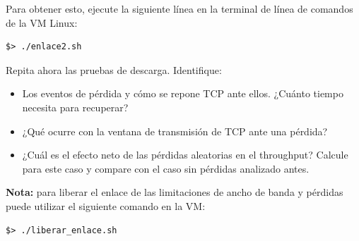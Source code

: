 \documentclass[a4paper,10pt]{article}
\begin{document}
\begin{enumerate}
Para obtener esto, ejecute la siguiente línea en la terminal de línea de comandos de la VM Linux:
   \begin{verbatim}
$> ./enlace2.sh
    \end{verbatim}

Repita ahora las pruebas de descarga. Identifique:
\begin{itemize}
    \item Los eventos de pérdida y cómo se repone TCP ante ellos. ¿Cuánto tiempo necesita para recuperar?
    \item ¿Qué ocurre con la ventana de transmisión de TCP ante una pérdida?
    \item ¿Cuál es el efecto neto de las pérdidas aleatorias en el throughput? Calcule para este caso y compare con el caso sin pérdidas analizado antes.
\end{itemize} 
\end{enumerate}


\textbf{Nota:} para liberar el enlace de las limitaciones de ancho de banda y pérdidas puede utilizar el siguiente comando en la VM:
\begin{verbatim}
$> ./liberar_enlace.sh
\end{verbatim}
\end{document}
